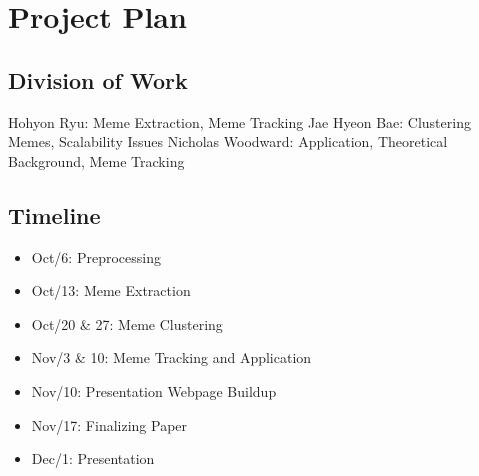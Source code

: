 \documentclass{sig-alternate}
\begin{document}
\section{Project Plan}

\subsection{Division of Work}

Hohyon Ryu: Meme Extraction, Meme Tracking
Jae Hyeon Bae: Clustering Memes, Scalability Issues
Nicholas Woodward: Application, Theoretical Background, Meme Tracking

\subsection{Timeline}


\begin{itemize}
  \item Oct/6: Preprocessing
  \item Oct/13: Meme Extraction
  \item Oct/20 \& 27: Meme Clustering
  \item Nov/3 \& 10: Meme Tracking and Application
  \item Nov/10: Presentation Webpage Buildup
  \item Nov/17: Finalizing Paper
  \item Dec/1: Presentation
\end{itemize}


%

\end{document}
